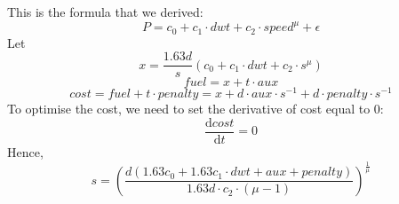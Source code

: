 \documentclass[a4paper,12pt]{article}
\begin{document}
This is the formula that we derived:
\[P=c_0+c_1\cdot dwt+c_2\cdot speed^{\mu}+\epsilon\]
Let \[x=\frac{1.63d}{s}(c_0+c_1\cdot dwt+c_2\cdot s^{\mu})\]
\[fuel=x+t\cdot aux\] 
\[cost=fuel+t\cdot penalty=x+d\cdot aux\cdot s^{-1}+d\cdot penalty\cdot s^{-1}\]
To optimise the cost, we need to set the derivative of cost equal to 0: \[\frac{\mathrm{d}cost}{\mathrm{d}t}=0\]
Hence,
\[s=(\frac{d(1.63c_0+1.63c_1\cdot dwt+aux+penalty)}{1.63d\cdot c_2\cdot (\mu-1)})^{\frac{1}{\mu}}\] 
\end{document}
